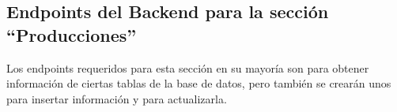 \subsection{Endpoints del Backend para la sección ``Producciones''}
Los endpoints requeridos para esta sección en su mayoría son para obtener información de ciertas tablas de la base de datos, pero también se crearán unos para insertar información y para actualizarla.
    
    
    
    
    
    
    